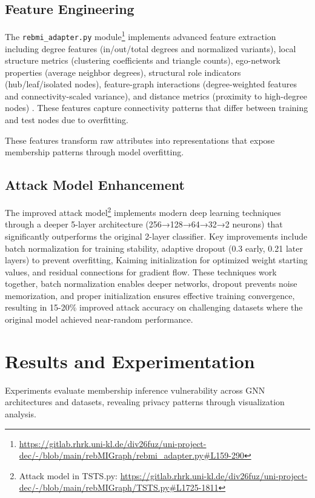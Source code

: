 \documentclass{article}
\begin{document}
\subsection{Feature Engineering}
The \texttt{rebmi\_adapter.py} module\footnote{\url{https://gitlab.rhrk.uni-kl.de/div26fuz/uni-project-dec/-/blob/main/rebMIGraph/rebmi_adapter.py\#L159-290}} implements advanced feature extraction including degree features (in/out/total degrees and normalized variants), local structure metrics (clustering coefficients and triangle counts), ego-network properties (average neighbor degrees), structural role indicators (hub/leaf/isolated nodes), feature-graph interactions (degree-weighted features and connectivity-scaled variance), and distance metrics (proximity to high-degree nodes) \cite{olatunji2021membershipinferenceattackgraph}. These features capture connectivity patterns that differ between training and test nodes due to overfitting.

These features transform raw attributes into representations that expose membership patterns through model overfitting.

\subsection{Attack Model Enhancement}
The improved attack model\footnote{Attack model in TSTS.py: \url{https://gitlab.rhrk.uni-kl.de/div26fuz/uni-project-dec/-/blob/main/rebMIGraph/TSTS.py\#L1725-1811}} implements modern deep learning techniques \cite{he2015delving} through a deeper 5-layer architecture (256→128→64→32→2 neurons) that significantly outperforms the original 2-layer classifier. Key improvements include batch normalization for training stability, adaptive dropout (0.3 early, 0.21 later layers) to prevent overfitting, Kaiming initialization for optimized weight starting values, and residual connections for gradient flow. These techniques work together, batch normalization enables deeper networks, dropout prevents noise memorization, and proper initialization ensures effective training convergence, resulting in 15-20\% improved attack accuracy on challenging datasets where the original model achieved near-random performance.

\section{Results and Experimentation}
\label{results}
Experiments evaluate membership inference vulnerability across GNN architectures and datasets, revealing privacy patterns through visualization analysis.
\end{document}
